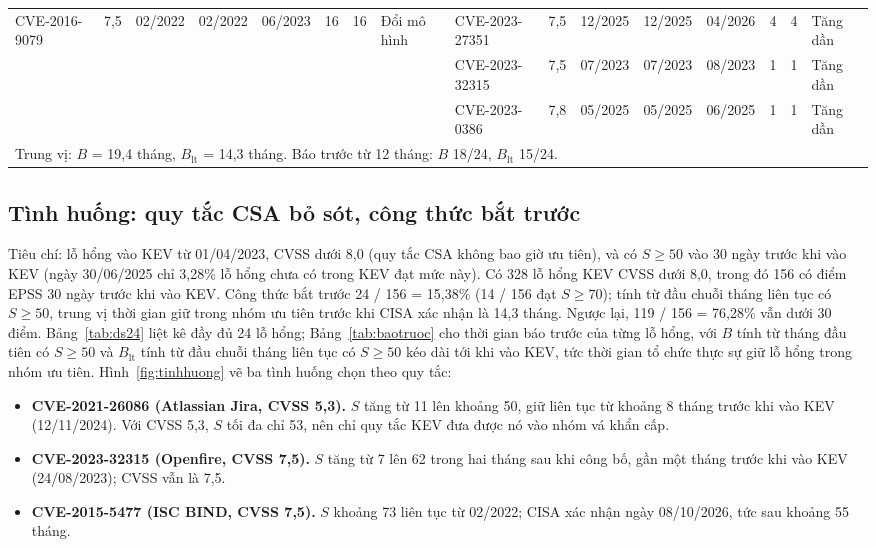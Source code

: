 \documentclass[conference]{IEEEtran}
\begin{document}
\begin{table}[t]
\begin{tabular}{lccccccl@{\hspace{1em}}lccccccl}
CVE-2016-9079 & 7,5 & 02/2022 & 02/2022 & 06/2023 & 16 & 16 & Đổi mô hình &
CVE-2023-27351 & 7,5 & 12/2025 & 12/2025 & 04/2026 & 4 & 4 & Tăng dần \\
 & & & & & & & &
CVE-2023-32315 & 7,5 & 07/2023 & 07/2023 & 08/2023 & 1 & 1 & Tăng dần \\
 & & & & & & & &
CVE-2023-0386 & 7,8 & 05/2025 & 05/2025 & 06/2025 & 1 & 1 & Tăng dần \\
\midrule
\multicolumn{16}{l}{Trung vị: $B$ = 19,4 tháng, $B_{\text{lt}}$ = 14,3 tháng. Báo trước từ 12 tháng: $B$ 18/24, $B_{\text{lt}}$ 15/24.} \\
\bottomrule
\end{tabular}
\end{table}

\subsection{Tình huống: quy tắc CSA bỏ sót, công thức bắt trước}
Tiêu chí: lỗ hổng vào KEV từ 01/04/2023, CVSS dưới 8,0 (quy tắc CSA không bao giờ ưu tiên), và có $S \ge 50$ vào
30 ngày trước khi vào KEV (ngày 30/06/2025 chỉ 3,28\% lỗ hổng chưa có trong KEV đạt mức này). Có 328 lỗ hổng KEV
CVSS dưới 8,0, trong đó 156 có điểm EPSS 30 ngày trước khi vào KEV. Công thức bắt trước 24 / 156 = 15,38\% (14 / 156
đạt $S \ge 70$); tính từ đầu chuỗi tháng liên tục có $S \ge 50$, trung vị thời gian giữ trong nhóm ưu tiên trước khi
CISA xác nhận là 14,3 tháng. Ngược lại, 119 / 156 = 76,28\% vẫn dưới 30 điểm. Bảng~\ref{tab:ds24} liệt kê đầy đủ 24
lỗ hổng; Bảng~\ref{tab:baotruoc} cho thời gian báo trước của từng lỗ hổng, với $B$ tính từ tháng đầu tiên có
$S \ge 50$ và $B_{\text{lt}}$ tính từ đầu chuỗi tháng liên tục có $S \ge 50$ kéo dài tới khi vào KEV, tức thời gian tổ
chức thực sự giữ lỗ hổng trong nhóm ưu tiên. Hình~\ref{fig:tinhhuong} vẽ ba tình
huống chọn theo quy tắc:
\begin{itemize}
\item \textbf{CVE-2021-26086 (Atlassian Jira, CVSS 5,3).} $S$ tăng từ 11 lên khoảng 50, giữ liên tục từ khoảng 8
tháng trước khi vào KEV (12/11/2024). Với CVSS 5,3, $S$ tối đa chỉ 53, nên chỉ quy tắc KEV đưa được nó vào nhóm vá khẩn
cấp.
\item \textbf{CVE-2023-32315 (Openfire, CVSS 7,5).} $S$ tăng từ 7 lên 62 trong hai tháng sau khi công bố, gần một
tháng trước khi vào KEV (24/08/2023); CVSS vẫn là 7,5.
\item \textbf{CVE-2015-5477 (ISC BIND, CVSS 7,5).} $S$ khoảng 73 liên tục từ 02/2022; CISA xác nhận ngày 08/10/2026,
tức sau khoảng 55 tháng.
\end{itemize}
\end{document}
